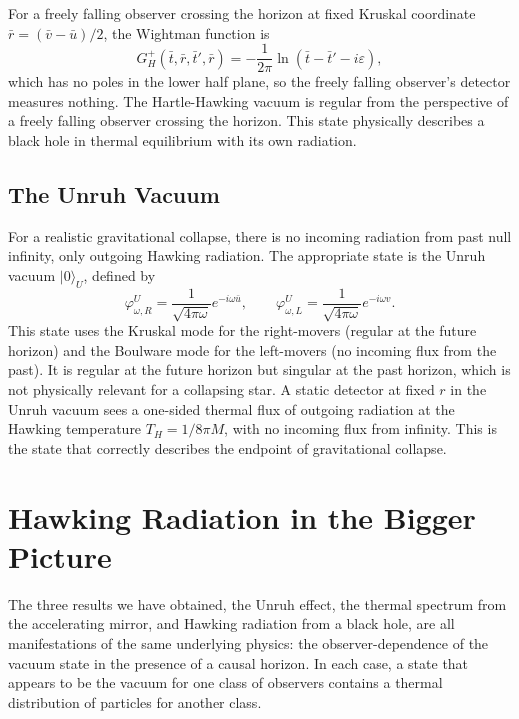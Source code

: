 For a freely falling observer crossing the horizon at fixed Kruskal
coordinate $\bar r = (\bar v - \bar u)/2$, the Wightman function is
\begin{equation}
    G^+_H(\bar t,\bar r,\bar t',\bar r)
    = -\frac{1}{2\pi}\ln(\bar t-\bar t'-i\varepsilon),
\end{equation}
which has no poles in the lower half plane, so the freely falling
observer's detector measures nothing. The Hartle-Hawking vacuum is
regular from the perspective of a freely falling observer crossing the
horizon. This state physically describes a black hole in thermal
equilibrium with its own radiation.

\subsection*{The Unruh Vacuum}

For a realistic gravitational collapse, there is no incoming radiation
from past null infinity, only outgoing Hawking radiation. The
appropriate state is the Unruh vacuum $|0\rangle_U$, defined by
\begin{equation}
    \varphi^U_{\omega,R}
    = \frac{1}{\sqrt{4\pi\omega}}e^{-i\omega\bar u},
    \qquad
    \varphi^U_{\omega,L}
    = \frac{1}{\sqrt{4\pi\omega}}e^{-i\omega v}.
\end{equation}
This state uses the Kruskal mode for the right-movers (regular at the
future horizon) and the Boulware mode for the left-movers (no incoming
flux from the past). It is regular at the future horizon but singular
at the past horizon, which is not physically relevant for a collapsing
star. A static detector at fixed $r$ in the Unruh vacuum sees a
one-sided thermal flux of outgoing radiation at the Hawking temperature
$T_H = 1/8\pi M$, with no incoming flux from infinity. This is the
state that correctly describes the endpoint of gravitational collapse.

\section{Hawking Radiation in the Bigger Picture}

The three results we have obtained, the Unruh effect, the thermal
spectrum from the accelerating mirror, and Hawking radiation from a
black hole, are all manifestations of the same underlying physics: the
observer-dependence of the vacuum state in the presence of a causal
horizon. In each case, a state that appears to be the vacuum for one
class of observers contains a thermal distribution of particles for
another class.


